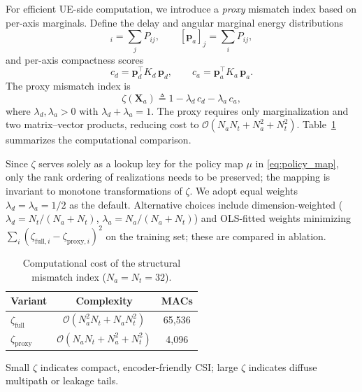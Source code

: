 \documentclass[conference]{IEEEtran}
\begin{document}
For efficient UE-side computation, we introduce a \emph{proxy} mismatch index based on per-axis marginals.
Define the delay and angular marginal energy distributions
\begin{equation}
[\mathbf{p}_d]_i = \sum_{j} P_{ij}, \qquad
[\mathbf{p}_a]_j = \sum_{i} P_{ij},
\label{eq:marginals}
\end{equation}
and per-axis compactness scores
\begin{equation}
c_d = \mathbf{p}_d^\top K_d\, \mathbf{p}_d, \qquad
c_a = \mathbf{p}_a^\top K_a\, \mathbf{p}_a.
\label{eq:per_axis_compactness}
\end{equation}
The proxy mismatch index is
\begin{equation}
\zeta(\mathbf{X}_a) \triangleq 1 - \lambda_d\, c_d - \lambda_a\, c_a,
\label{eq:struct_state}
\end{equation}
where $\lambda_d, \lambda_a > 0$ with $\lambda_d + \lambda_a = 1$.
The proxy requires only marginalization and two matrix--vector products, reducing cost to $\mathcal{O}(N_a N_t + N_a^2 + N_t^2)$.
Table~\ref{tab:zeta_runtime} summarizes the computational comparison.

Since $\zeta$ serves solely as a lookup key for the policy map $\mu$ in \eqref{eq:policy_map}, only the rank ordering of realizations needs to be preserved; the mapping is invariant to monotone transformations of $\zeta$.
We adopt equal weights $\lambda_d = \lambda_a = 1/2$ as the default.
Alternative choices include dimension-weighted ($\lambda_d = N_t/(N_a+N_t)$, $\lambda_a = N_a/(N_a+N_t)$) and OLS-fitted weights minimizing $\sum_i(\zeta_{\mathrm{full},i} - \zeta_{\mathrm{proxy},i})^2$ on the training set; these are compared in ablation.

\begin{table}[t]
\centering
\caption{Computational cost of the structural mismatch index ($N_a = N_t = 32$).}
\label{tab:zeta_runtime}
\setlength{\tabcolsep}{5pt}
\begin{tabular}{lcc}
\toprule
Variant & Complexity & MACs \\
\midrule
$\zeta_{\mathrm{full}}$ & $\mathcal{O}(N_a^2 N_t + N_a N_t^2)$ & 65{,}536 \\
$\zeta_{\mathrm{proxy}}$ & $\mathcal{O}(N_a N_t + N_a^2 + N_t^2)$ & 4{,}096 \\
\bottomrule
\end{tabular}
\end{table}

Small $\zeta$ indicates compact, encoder-friendly CSI; large $\zeta$ indicates diffuse multipath or leakage tails.
\end{document}
